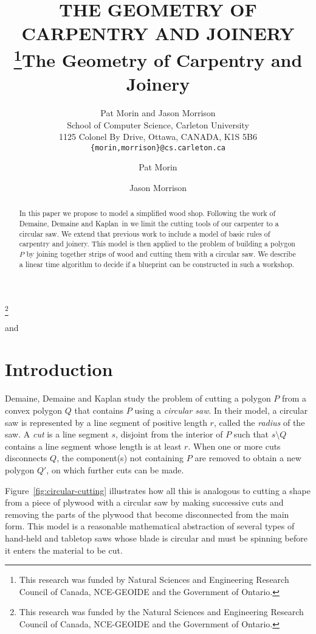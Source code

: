 \documentclass{elsart}
\title{\MakeUppercase{The Geometry of Carpentry and Joinery}%
  \thanks{This research was funded
    by Natural Sciences and Engineering Research Council of Canada, NCE-GEOIDE
    and the Government of Ontario.}}
\author{Pat Morin and Jason Morrison \\[1ex] 
	School of Computer Science, Carleton University \\
	1125 Colonel By Drive, Ottawa, CANADA, K1S 5B6 \\
	\texttt{\{morin,morrison\}@cs.carleton.ca}}
\date{}
\begin{document}
\begin{frontmatter}
\title{The Geometry of Carpentry and Joinery}
\thanks[nserc]{This research was funded by the Natural Sciences and
Engineering Research Council of Canada, NCE-GEOIDE and the Government
of Ontario.}
\author{Pat Morin} and
\author{Jason Morrison}
\address{School of Computer Science, Carleton University, 1125 Colonel
By Drive \\ Ottawa, Ontario, CANADA K1S~5B6}
\begin{abstract}
  In this paper we propose to model a simplified wood shop.  Following
  the work of {\mbox{Demaine}, \mbox{Demaine} and \mbox{Kaplan}}\ in
  \cite{ddk02} we limit the cutting tools of our carpenter to a
  circular saw.  We extend that previous work to include a model of
  basic rules of carpentry and joinery.  This model is then applied to
  the problem of building a polygon $P$ by joining together strips of
  wood and cutting them with a circular saw.  We describe a linear
  time algorithm to decide if a blueprint can be constructed in such a
  workshop.
\end{abstract}

\end{frontmatter}

\section{Introduction}

{\mbox{Demaine}, \mbox{Demaine} and \mbox{Kaplan}} \cite{ddk02} study
the problem of cutting a polygon $P$ from a convex polygon $Q$ that
contains $P$ using a \emph{circular saw}.  In their model, a circular
saw is represented by a line segment of positive length $r$, called
the \emph{radius} of the saw.  A \emph{cut} is a line segment $s$,
disjoint from the interior of $P$ such that $s\setminus Q$ contains a
line segment whose length is at least $r$.  When one or more cuts
disconnects $Q$, the component(s) not containing $P$ are removed to
obtain a new polygon $Q'$, on which further cuts can be made.

Figure~\ref{fig:circular-cutting} illustrates how all this is
analogous to cutting a shape from a piece of plywood with a circular
saw by making successive cuts and removing the parts of the plywood
that become disconnected from the main form.  This model is a
reasonable mathematical abstraction of several types of hand-held and
tabletop saws whose blade is circular and must be spinning before it
enters the material to be cut.
\end{document}
